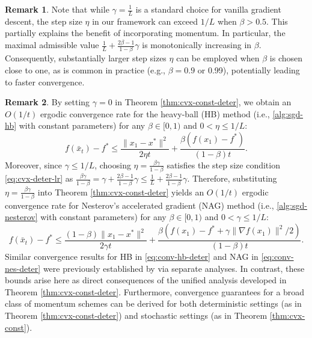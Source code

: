 \documentclass[10pt]{article}
\numberwithin{equation}{section}
\theoremstyle{definition}
\newtheorem{remark}{Remark}
\begin{document}
\begin{remark}
    Note that while $\gamma = \frac{1}{L}$ is a standard choice for vanilla gradient descent, the step size $\eta$ in our framework can exceed $1/L$ when $\beta>0.5$. This partially explains the benefit of incorporating momentum. In particular, the maximal admissible value $\frac{1}{L}+\frac{2\beta-1}{1-\beta}\gamma$ is monotonically increasing in $\beta$. Consequently, substantially larger step sizes $\eta$ can be employed when $\beta$ is chosen close to one, as is common in practice (e.g., $\beta=0.9$ or 0.99), potentially leading to faster convergence.
\end{remark}

\begin{remark}
By setting $\gamma=0$ in Theorem \ref{thm:cvx-const-deter}, we obtain an $O(1/t)$ ergodic convergence rate for the heavy-ball (HB) method (i.e., \eqref{alg:sgd-hb} with constant parameters) for any $\beta\in[0,1)$ and $0<\eta\leq 1/L$:
\begin{equation}\label{eq:conv-hb-deter}
    f(\bar{x}_t)-f^* \leq \frac{\|x_1-x^*\|^2}{2\eta t}+\frac{\beta (f(x_1)-f^*)}{(1-\beta) t}.
\end{equation}
Moreover, since $\gamma\leq 1/L$, choosing $\eta=\frac{\beta\gamma}{1-\beta}$ satisfies the step size condition \eqref{eq:cvx-deter-lr} as $\frac{\beta\gamma}{1-\beta}=\gamma+\frac{2\beta-1}{1-\beta}\gamma\leq \frac{1}{L}+\frac{2\beta-1}{1-\beta}\gamma$.
Therefore, substituting $\eta=\frac{\beta\gamma}{1-\beta}$ into Theorem \ref{thm:cvx-const-deter} yields an $O(1/t)$ ergodic convergence rate for Nesterov's accelerated gradient (NAG) method (i.e., \eqref{alg:sgd-nesterov} with constant parameters) for any $\beta\in[0,1)$ and $0<\gamma\leq 1/L$:
\begin{equation}\label{eq:conv-nes-deter}
  f(\bar{x}_t)-f^* \leq \frac{(1-\beta)\|x_1-x^*\|^2}{2\gamma t}+\frac{\beta (f(x_1)-f^*+\gamma\|\nabla f(x_1)\|^2/2)}{(1-\beta) t}. 
\end{equation}
Similar convergence results for HB in \eqref{eq:conv-hb-deter} and NAG in \eqref{eq:conv-nes-deter} were previously established by \citet{ghadimi2015global} via separate analyses. In contrast, these bounds arise here as direct consequences of the unified analysis developed in Theorem \ref{thm:cvx-const-deter}. Furthermore, convergence guarantees for a broad class of momentum schemes can be derived for both deterministic settings (as in Theorem \ref{thm:cvx-const-deter}) and stochastic settings (as in Theorem \ref{thm:cvx-const}).
\end{remark}
\end{document}

